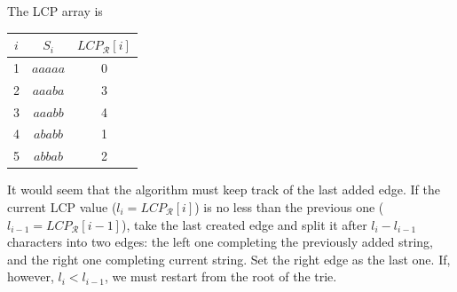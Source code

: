 \documentclass[10pt]{article}
\begin{document}
The LCP array is
\begin{center}
\begin{tabular}{|c|c|c|}
\hline
$i$ & $S_i$ & $LCP_{\mathcal{R}}[i]$ \\
\hline 
1 & $aaaaa$ & 0 \\
2 & $aaaba$ & 3 \\
3 & $aaabb$ & 4 \\
4 & $ababb$ & 1 \\
5 & $abbab$ & 2 \\
\hline
\end{tabular}
\end{center}
It would seem that the algorithm must keep track of the last added edge. If the current LCP value ($l_i = LCP_{\mathcal{R}}[i]$)  is no less than the previous one ($l_{i - 1} = LCP_{\mathcal{R}}[i - 1]$), take the last created edge and split it after $l_i - l_{i - 1}$ characters into two edges: the left one completing the previously added string, and the right one completing current string. Set the right edge as the last one. If, however, $l_i < l_{i - 1}$, we must restart from the root of the trie.
\end{document}

